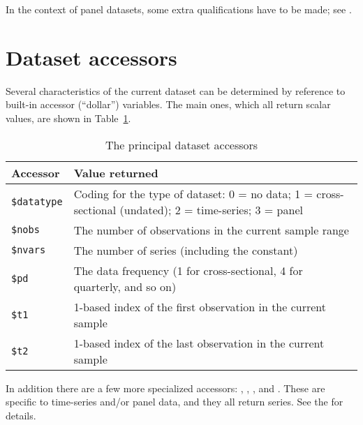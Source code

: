 In the context of panel datasets, some extra qualifications have to be
made; see \GUG.

\section{Dataset accessors}
\label{sec:accessors}

Several characteristics of the current dataset can be determined by
reference to built-in accessor (``dollar'') variables. The main ones,
which all return scalar values, are shown in
Table~\ref{tab:dataset-accessors}.

\begin{table}[htbp]
  \centering
  \begin{tabular}{lp{}}
    \textbf{Accessor} & \textbf{Value returned} \\ \hline
    \verb|$datatype| & Coding for the type of dataset:
    0 = no data; 1 = cross-sectional (undated); 2 = time-series;
    3 = panel \\
    \verb|$nobs| & The number of observations in the current
    sample range \\
    \verb|$nvars| & The number of series (including the constant)\\
    \verb|$pd| & The data frequency (1 for cross-sectional, 4 for
    quarterly, and so on) \\
    \verb|$t1| & 1-based index of the first observation in the
    current sample \\
    \verb|$t2| & 1-based index of the last observation in the
    current sample \\
    \hline
  \end{tabular}
  \caption{The principal dataset accessors}
  \label{tab:dataset-accessors}
\end{table}

In addition there are a few more specialized accessors:
, , ,
 and . These are specific to time-series
and/or panel data, and they all return series. See the \GCR{} for
details.



